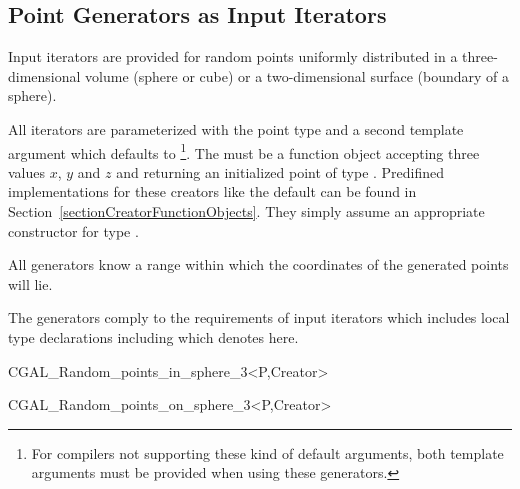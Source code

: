 \subsection{Point Generators as Input Iterators}

\ccDefinition

Input iterators are provided for random points uniformly distributed
in a three-dimensional volume (sphere or cube) or a two-dimensional
surface (boundary of a sphere).

All iterators are parameterized with the point type  and a second
template argument  which defaults to
\footnote{%
  For compilers not supporting these kind of default arguments, both
  template arguments must be provided when using these generators.}.
The  must be a function object accepting three
 values $x$, $y$ and $z$ and returning an initialized
point  of type . Predifined implementations for
these creators like the default can be found in
Section~\ref{sectionCreatorFunctionObjects}.  They simply assume an
appropriate constructor for type .

All generators know a range within which the coordinates of the
generated points will lie.


\ccTypes

The generators comply to the requirements of input iterators which
includes local type declarations including  which
denotes  here.

\ccCreation


\ccHtmlNoClassFile
\begin{ccClassTemplate}{CGAL_Random_points_in_sphere_3<P,Creator>}
\end{ccClassTemplate}

\ccHtmlNoClassFile
\begin{ccClassTemplate}{CGAL_Random_points_on_sphere_3<P,Creator>}
\end{ccClassTemplate}


